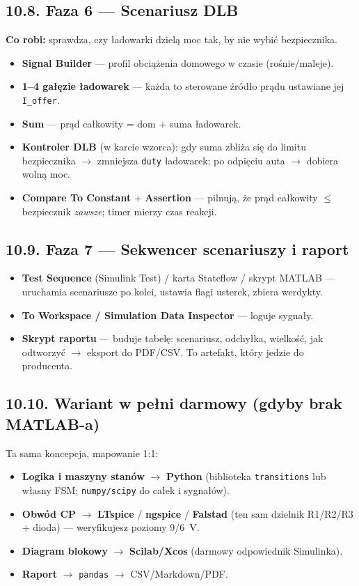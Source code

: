 \documentclass[11pt]{article}
\newcommand{\ra}{$\rightarrow$}
\newcommand{\key}[1]{\textbf{\color{navy}#1}}
\begin{document}
\subsection{10.8. Faza 6 --- Scenariusz DLB}

\key{Co robi:} sprawdza, czy ładowarki dzielą moc tak, by nie wybić bezpiecznika.
\begin{itemize}
  \item \key{Signal Builder} --- profil obciążenia domowego w czasie (rośnie/maleje).
  \item \key{1--4 gałęzie ładowarek} --- każda to sterowane źródło prądu ustawiane jej \texttt{I\_offer}.
  \item \key{Sum} --- prąd całkowity = dom + suma ładowarek.
  \item \key{Kontroler DLB} (w karcie wzorca): gdy suma zbliża się do limitu bezpiecznika \ra{} zmniejsza \texttt{duty} ładowarek; po odpięciu auta \ra{} dobiera wolną moc.
  \item \key{Compare To Constant} + \key{Assertion} --- pilnują, że prąd całkowity $\le$ bezpiecznik \emph{zawsze}; timer mierzy czas reakcji.
\end{itemize}

\subsection{10.9. Faza 7 --- Sekwencer scenariuszy i raport}

\begin{itemize}
  \item \key{Test Sequence} (Simulink Test) / karta Stateflow / skrypt MATLAB --- uruchamia scenariusze po kolei, ustawia flagi usterek, zbiera werdykty.
  \item \key{To Workspace / Simulation Data Inspector} --- loguje sygnały.
  \item \key{Skrypt raportu} --- buduje tabelę: scenariusz, odchyłka, wielkość, jak odtworzyć \ra{} eksport do PDF/CSV. To artefakt, który jedzie do producenta.
\end{itemize}

\subsection{10.10. Wariant w pełni darmowy (gdyby brak MATLAB-a)}

Ta sama koncepcja, mapowanie 1:1:
\begin{itemize}
  \item \key{Logika i maszyny stanów} \ra{} \key{Python} (biblioteka \texttt{transitions} lub własny FSM; \texttt{numpy/scipy} do całek i sygnałów).
  \item \key{Obwód CP} \ra{} \key{LTspice} / \key{ngspice} / \key{Falstad} (ten sam dzielnik R1/R2/R3 + dioda) --- weryfikujesz poziomy 9/6~V.
  \item \key{Diagram blokowy} \ra{} \key{Scilab/Xcos} (darmowy odpowiednik Simulinka).
  \item \key{Raport} \ra{} \texttt{pandas} \ra{} CSV/Markdown/PDF.
\end{itemize}
\end{document}
